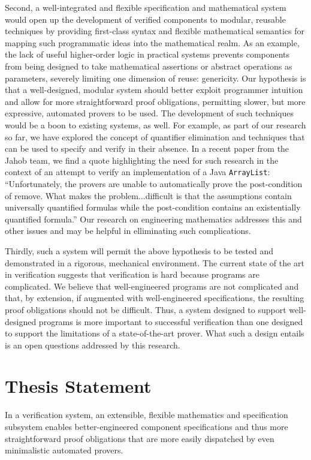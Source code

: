 Second, a well-integrated and flexible specification and mathematical system would open up the development of verified components to modular, reusable techniques by providing first-class syntax and flexible mathematical semantics for mapping such programmatic ideas into the mathematical realm.  As an example, the lack of useful higher-order logic in practical systems prevents components from being designed to take mathematical assertions or abstract operations as parameters, severely limiting one dimension of reuse: genericity\cite{bronishMap}.  Our hypothesis is that a well-designed, modular system should better exploit programmer intuition and allow for more straightforward proof obligations, permitting slower, but more expressive, automated provers to be used.  The development of such techniques would be a boon to existing systems, as well.  For example, as part of our research so far, we have explored the concept of quantifier elimination and techniques that can be used to specify and verify in their absence.  In a recent paper from the Jahob team, we find a quote highlighting the need for such research in the context of an attempt to verify an implementation of a Java \texttt{ArrayList}: ``Unfortunately, the provers are unable to automatically prove the post-condition of remove.  What makes the problem...difficult is that the assumptions contain universally quantified formulas while the post-condition contains an existentially quantified formula.''  Our research on engineering mathematics addresses this and other issues and may be helpful in elliminating such complications.

Thirdly, such a system will permit the above hypothesis to be tested and demonstrated in a rigorous, mechanical environment.  The current state of the art in verification suggests that verification is hard because programs are complicated.  We believe that well-engineered programs are not complicated and that, by extension, if augmented with well-engineered specifications, the resulting proof obligations should not be difficult.  Thus, a system designed to support well-designed programs is more important to successful verification than one designed to support the limitations of a state-of-the-art prover.  What such a design entails is an open questions addressed by this research.

\section{Thesis Statement}
In a verification system, an extensible, flexible mathematics and specification subsystem enables better-engineered component specifications and thus more straightforward proof obligations that are more easily dispatched by even minimalistic automated provers.

